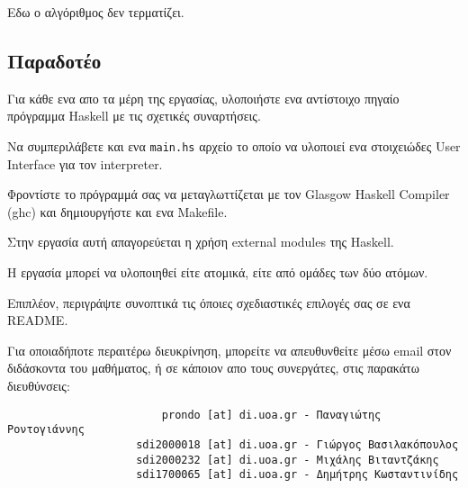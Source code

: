 \documentclass[10pt]{article}
\begin{document}
Εδω ο αλγόριθμος δεν τερματίζει.

\subsection*{Παραδοτέο}

Για κάθε ενα απο τα μέρη της εργασίας, υλοποιήστε ενα αντίστοιχο πηγαίο πρόγραμμα Haskell με τις σχετικές συναρτήσεις. \

Να συμπεριλάβετε και ενα \verb|main.hs| αρχείο το οποίο να υλοποιεί ενα στοιχειώδες User Interface για τον interpreter.\

Φροντίστε το πρόγραμμά σας να μεταγλωττίζεται με τον Glasgow Haskell Compiler (ghc) και δημιουργήστε και ενα Makefile.\

Στην εργασία αυτή απαγορεύεται η χρήση external modules της Haskell.\

Η εργασία μπορεί να υλοποιηθεί είτε ατομικά, είτε από ομάδες των δύο ατόμων.\

Επιπλέον, περιγράψτε συνοπτικά τις όποιες σχεδιαστικές επιλογές σας σε ενα README.\

Για οποιαδήποτε περαιτέρω διευκρίνηση, μπορείτε να απευθυνθείτε μέσω email στον διδάσκοντα του μαθήματος, ή σε κάποιον απο τους συνεργάτες, στις παρακάτω διευθύνσεις:

\begin{verbatim}
                        prondo [at] di.uoa.gr - Παναγιώτης Ροντογιάννης
                    sdi2000018 [at] di.uoa.gr - Γιώργος Βασιλακόπουλος
                    sdi2000232 [at] di.uoa.gr - Μιχάλης Βιταντζάκης
                    sdi1700065 [at] di.uoa.gr - Δημήτρης Κωσταντινίδης
\end{verbatim}
\end{document}
